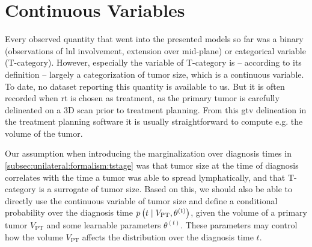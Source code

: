 \documentclass[\relativeRoot/main.tex]{subfiles}
\begin{document}
\section{Continuous Variables}
\label{sec:future:continuous}

Every observed quantity that went into the presented models so far was a binary (observations of \gls{lnl} involvement, extension over mid-plane) or categorical variable (T-category). However, especially the variable of T-category is -- according to its definition \cite{brierley_tnm_2017} -- largely a categorization of tumor size, which is a continuous variable. To date, no dataset reporting this quantity is available to us. But it is often recorded when \acrlong{rt} is chosen as treatment, as the primary tumor is carefully delineated on a 3D scan prior to treatment planning. From this \gls{gtv} delineation in the treatment planning software it is usually straightforward to compute e.g. the volume of the tumor.

Our assumption when introducing the marginalization over diagnosis times in \cref{subsec:unilateral:formalism:tstage} was that tumor size at the time of diagnosis correlates with the time a tumor was able to spread lymphatically, and that T-category is a surrogate of tumor size. Based on this, we should also be able to directly use the continuous variable of tumor size and define a conditional probability over the diagnosis time $p \left( t \mid V_\text{PT}, \theta^{(t)} \right)$, given the volume of a primary tumor $V_\text{PT}$ and some learnable parameters $\theta^{(t)}$. These parameters may control how the volume $V_\text{PT}$ affects the distribution over the diagnosis time $t$.
\end{document}
